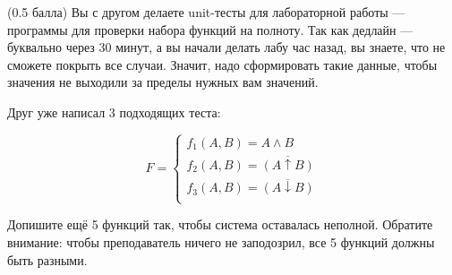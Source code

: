 \question
(0.5 балла) Вы с другом делаете unit-тесты для лабораторной работы — программы для проверки набора функций на полноту. Так как дедлайн — буквально через 30 минут, а вы начали делать лабу час назад, вы знаете, что не сможете покрыть все случаи. Значит, надо сформировать такие данные, чтобы значения не выходили за пределы нужных вам значений.

Друг уже написал 3 подходящих теста:

\begin{equation*}
    F=
    \begin{cases}
        f_1(A,B)=A \land B\\
        f_2(A,B)=\overline{(A \uparrow B)}\\
        f_3(A,B)=\overline{(A \downarrow B)}\\
    \end{cases}
\end{equation*}
    
Допишите ещё 5 функций так, чтобы система оставалась неполной. Обратите внимание: чтобы преподаватель ничего не заподозрил, все 5 функций должны быть разными.